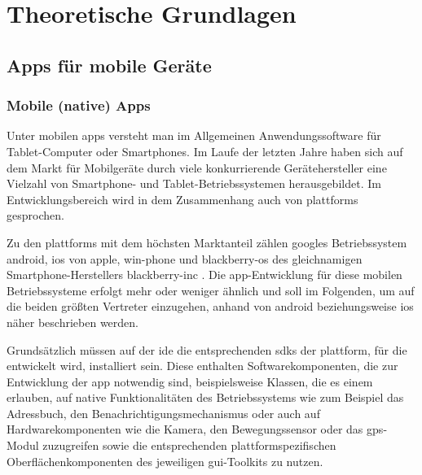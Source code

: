 \chapter{Theoretische Grundlagen}

\section{Apps für mobile Geräte}

\subsection{Mobile (native) Apps} \label{sec:native}
Unter mobilen \glspl{app} versteht man im Allgemeinen Anwendungssoftware für Tablet-Computer oder Smartphones. 
Im Laufe der letzten Jahre haben sich auf dem Markt für Mobilgeräte durch viele konkurrierende Gerätehersteller eine Vielzahl von Smartphone- und Tablet-Betriebssystemen herausgebildet.
Im Entwicklungsbereich wird in dem Zusammenhang auch von \glspl{plattform} gesprochen.

Zu den \glspl{plattform} mit dem höchsten Marktanteil zählen \glspl{google} Betriebssystem \gls{android}, \gls{ios} von \gls{apple}, \gls{win-phone} und \gls{blackberry-os} des gleichnamigen Smartphone-Herstellers \gls{blackberry-inc} \cite{platforms-marketshare}.
Die \gls{app}-Entwicklung für diese mobilen Betriebssysteme erfolgt mehr oder weniger ähnlich und soll im Folgenden, um auf die beiden größten Vertreter einzugehen, anhand von \gls{android} beziehungsweise \gls{ios} näher beschrieben werden.

Grundsätzlich müssen auf der \gls{ide} die entsprechenden \glspl{sdk} der \gls{plattform}, für die entwickelt wird, installiert sein. 
Diese enthalten Softwarekomponenten, die zur Entwicklung der \gls{app} notwendig sind, beispielsweise Klassen, die es einem erlauben, auf native Funktionalitäten des Betriebssystems wie zum Beispiel das Adressbuch, den Benachrichtigungsmechanismus oder auch auf Hardwarekomponenten wie die Kamera, den Bewegungssensor oder das \gls{gps}-Modul zuzugreifen sowie die entsprechenden plattformspezifischen Oberflächenkomponenten des jeweiligen \gls{gui}-Toolkits zu nutzen.

